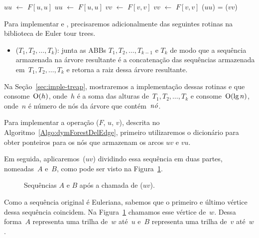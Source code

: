 \begin{algorithm}[htb]
\caption{\dymForestQuery($F$, $u$, $v$)}
\label{Algo:dymForestQuery}
\begin{algorithmic}[1]
\State $uu$ $\gets$ $F[u,u]$
\State $\mathit{uu}$ $\gets$ $F[u,u]$
\State $vv$ $\gets$ $F[v,v]$
\State $\mathit{vv}$ $\gets$ $F[v,v]$
\State \Return \treapGetRoot($uu$) = \treapGetRoot($vv$)
\end{algorithmic}
\end{algorithm}

Para implementar \dymForestAddEdge{} e \dymForestDelEdge{}, precisaremos adicionalmente das seguintes rotinas na biblioteca de Euler tour trees. 
\begin{itemize}
\item \treapJoin($T_1, T_2, \ldots, T_k$): junta as ABBs $T_1, T_2, \ldots, T_{k-1}$ e $T_k$ de modo que a sequência armazenada na árvore resultante é a concatenação das sequências armazenada em~$T_1, T_2, \ldots, T_k$ e retorna a raiz dessa árvore resultante.
\end{itemize}

Na Seção~\ref{sec:imple-treap}, mostraremos a implementação dessas rotinas e que~\treapJoin{} consome~$\mathrm{O}(h)$, onde~$h$ é a soma das alturas de~$T_1, T_2, \ldots, T_k$ e \treapSplit{} consome~$\mathrm{O}(\lg n)$, onde~$n$ é número de nós da árvore que contém~$\mathit{n\acute{o}}$.

Para implementar a operação \dymForestDelEdge($F$, $u$, $v$), descrita no Algoritmo~\ref{Algo:dymForestDelEdge}, 
primeiro utilizaremos o dicionário para obter ponteiros para os nós que armazenam os arcos $uv$ e $vu$.

Em seguida, aplicaremos~\treapSplit($uv$) dividindo essa sequência em duas partes, nomeadas~$A$ e~$B$, como pode ser visto na Figura~\ref{fig:algorit-cut-seqxy}.
\begin{figure}[htb]
\centering

\caption{Sequências $A$ e $B$ após a chamada de \treapSplit($uv$).}
\label{fig:algorit-cut-seqxy}
\end{figure}

Como a sequência original é Euleriana, sabemos que o primeiro e último vértice dessa sequência coincidem. Na Figura~\ref{fig:algorit-cut-seqxy} chamamos esse vértice de~$w$.
Dessa forma~$A$ representa uma trilha de~$w$ até~$u$ e~$B$ representa uma trilha de~$v$ até~$w$.

